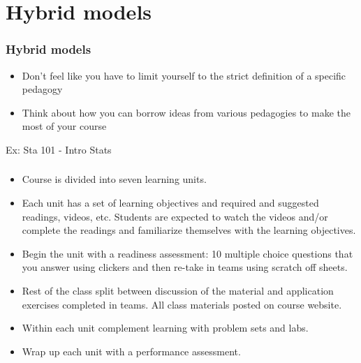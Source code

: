 \documentclass{beamer}
\begin{document}

\section{Hybrid models}


\begin{frame}
\frametitle{Hybrid models}

\begin{itemize}

\item Don't feel like you have to limit yourself to the strict definition of a specific pedagogy

\pause

\item Think about how you can borrow ideas from various pedagogies to make the most of your course

\end{itemize}

\end{frame}



\begin{frame}{Ex: Sta 101 - Intro Stats}
\frametitle{}

\begin{itemize}

\item Course is divided into seven learning units. 

\pause

\item Each unit has a set of learning objectives and required and suggested readings, videos, etc. Students are expected to watch the videos and/or complete the readings and familiarize themselves with the learning objectives. 

\pause

\item Begin the unit with a readiness assessment: 10 multiple choice questions that you answer using clickers and then re-take in teams using scratch off sheets.

\pause

\item Rest of the class split between discussion of the material and application exercises completed in teams. All class materials posted on course website.

\pause

\item Within each unit complement learning with problem sets and labs.

\pause

\item Wrap up each unit with a performance assessment.

\end{itemize}

\end{frame}
\end{document}
